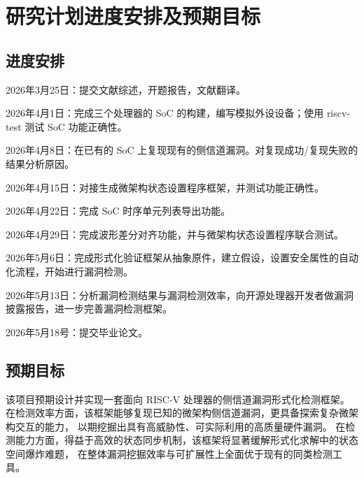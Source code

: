 \section{研究计划进度安排及预期目标}

\subsection{进度安排}
2026年3月25日：提交文献综述，开题报告，文献翻译。

2026年4月1日：完成三个处理器的 SoC 的构建，编写模拟外设设备；使用 riscv-test 测试 SoC 功能正确性。

2026年4月8日：在已有的 SoC 上复现现有的侧信道漏洞。对复现成功/复现失败的结果分析原因。

2026年4月15日：对接生成微架构状态设置程序框架，并测试功能正确性。

2026年4月22日：完成 SoC 时序单元列表导出功能。

2026年4月29日：完成波形差分对齐功能，并与微架构状态设置程序联合测试。

2026年5月6日：完成形式化验证框架从抽象原件，建立假设，设置安全属性的自动化流程，开始进行漏洞检测。

2026年5月13日：分析漏洞检测结果与漏洞检测效率，向开源处理器开发者做漏洞披露报告，进一步完善漏洞检测框架。

2026年5月18号：提交毕业论文。


\subsection{预期目标}

该项目预期设计并实现一套面向 RISC-V 处理器的侧信道漏洞形式化检测框架。
在检测效率方面，该框架能够复现已知的微架构侧信道漏洞，更具备探索复杂微架构交互的能力，
以期挖掘出具有高威胁性、可实际利用的高质量硬件漏洞。
在检测能力方面，得益于高效的状态同步机制，该框架将显著缓解形式化求解中的状态空间爆炸难题，
在整体漏洞挖掘效率与可扩展性上全面优于现有的同类检测工具。